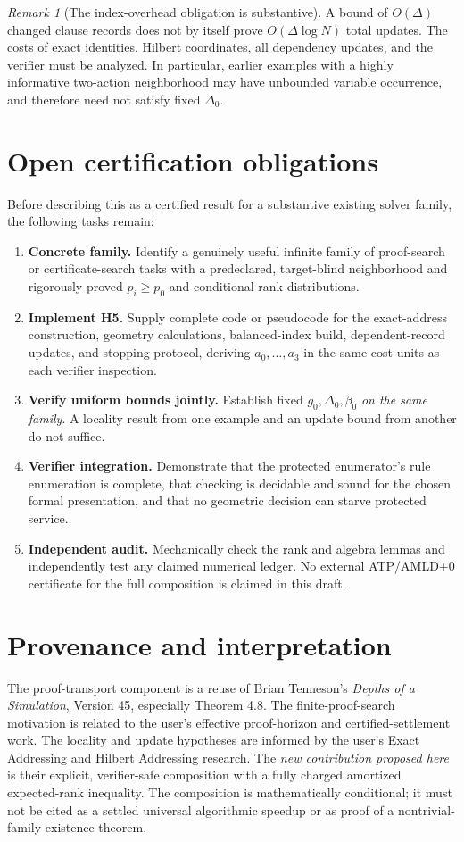 \documentclass[11pt,letterpaper]{article}
\theoremstyle{definition}
\theoremstyle{remark}
\newtheorem{remark}[theorem]{Remark}
\begin{document}
\begin{remark}[The index-overhead obligation is substantive]
A bound of $O(\Delta)$ changed clause records does not by itself prove $O(\Delta\log N)$ total updates. The costs of exact identities, Hilbert coordinates, all dependency updates, and the verifier must be analyzed. In particular, earlier examples with a highly informative two-action neighborhood may have unbounded variable occurrence, and therefore need not satisfy fixed $\Delta_0$.
\end{remark}

\section{Open certification obligations}
Before describing this as a certified result for a substantive existing solver family, the following tasks remain:
\begin{enumerate}[leftmargin=1.8em,itemsep=0.3em]
 \item \textbf{Concrete family.} Identify a genuinely useful infinite family of proof-search or certificate-search tasks with a predeclared, target-blind neighborhood and rigorously proved $p_i\ge p_0$ and conditional rank distributions.
 \item \textbf{Implement H5.} Supply complete code or pseudocode for the exact-address construction, geometry calculations, balanced-index build, dependent-record updates, and stopping protocol, deriving $a_0,\dots,a_3$ in the same cost units as each verifier inspection.
 \item \textbf{Verify uniform bounds jointly.} Establish fixed $g_0,\Delta_0,\beta_0$ \emph{on the same family}. A locality result from one example and an update bound from another do not suffice.
 \item \textbf{Verifier integration.} Demonstrate that the protected enumerator's rule enumeration is complete, that checking is decidable and sound for the chosen formal presentation, and that no geometric decision can starve protected service.
 \item \textbf{Independent audit.} Mechanically check the rank and algebra lemmas and independently test any claimed numerical ledger. No external ATP/AMLD+0 certificate for the full composition is claimed in this draft.
\end{enumerate}

\section{Provenance and interpretation}
The proof-transport component is a reuse of Brian Tenneson's \emph{Depths of a Simulation}, Version 45, especially Theorem 4.8. The finite-proof-search motivation is related to the user's effective proof-horizon and certified-settlement work. The locality and update hypotheses are informed by the user's Exact Addressing and Hilbert Addressing research. The \emph{new contribution proposed here} is their explicit, verifier-safe composition with a fully charged amortized expected-rank inequality. The composition is mathematically conditional; it must not be cited as a settled universal algorithmic speedup or as proof of a nontrivial-family existence theorem.
\end{document}
